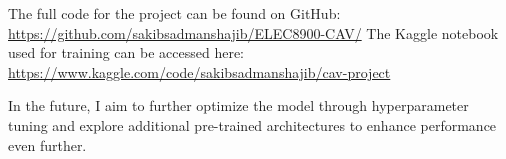 \documentclass[11pt]{article}
\begin{document}
The full code for the project can be found on GitHub: \url{https://github.com/sakibsadmanshajib/ELEC8900-CAV/} \newline
The Kaggle notebook used for training can be accessed here: \url{https://www.kaggle.com/code/sakibsadmanshajib/cav-project}

In the future, I aim to further optimize the model through hyperparameter tuning and explore additional pre-trained architectures to enhance performance even further.
\end{document}
